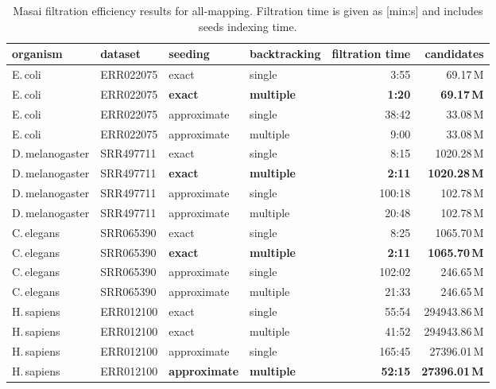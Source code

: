 \begin{table*}[h]
  \center
  \caption[Masai filtration efficiency results]{
    \label{tab:Filtration}%
    Masai filtration efficiency results for all-mapping.
    Filtration time is given as [min:s] and includes seeds indexing time.
  }
  {
  \sffamily
  \footnotesize
  \begin{tabular}{llllrr}
    \toprule
	organism & dataset & seeding & backtracking & filtration time & candidates\\
    \midrule
E.\,coli & ERR022075 & exact & single & 3:55 & 69.17\,M\\
E.\,coli & ERR022075 & \textbf{exact} & \textbf{multiple} & \textbf{1:20} & \textbf{69.17\,M}\\
E.\,coli & ERR022075 & approximate & single & 38:42 & 33.08\,M\\
E.\,coli & ERR022075 & approximate & multiple & 9:00 & 33.08\,M\\
    \midrule
D.\,melanogaster & SRR497711 & exact & single & 8:15 & 1020.28\,M\\
D.\,melanogaster & SRR497711 & \textbf{exact} & \textbf{multiple} & \textbf{2:11} & \textbf{1020.28\,M}\\
D.\,melanogaster & SRR497711 & approximate & single & 100:18 & 102.78\,M\\
D.\,melanogaster & SRR497711 & approximate & multiple & 20:48 & 102.78\,M\\
    \midrule
C.\,elegans & SRR065390 & exact & single & 8:25 & 1065.70\,M\\
C.\,elegans & SRR065390 & \textbf{exact} & \textbf{multiple} & \textbf{2:11} & \textbf{1065.70\,M}\\
C.\,elegans & SRR065390 & approximate & single & 102:02 & 246.65\,M\\
C.\,elegans & SRR065390 & approximate & multiple & 21:33 & 246.65\,M\\
	\midrule
H.\,sapiens & ERR012100 & exact & single & 55:54 & 294943.86\,M\\
H.\,sapiens & ERR012100 & exact & multiple & 41:52 & 294943.86\,M\\
H.\,sapiens & ERR012100 & approximate & single & 165:45 & 27396.01\,M\\
H.\,sapiens & ERR012100 & \textbf{approximate} & \textbf{multiple} & \textbf{52:15} & \textbf{27396.01\,M}\\
    \bottomrule
  \end{tabular}
  }
  \vspace{2mm}
\end{table*}


